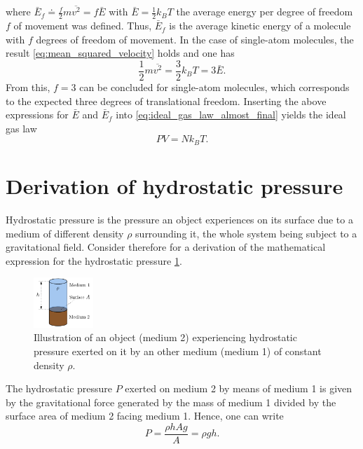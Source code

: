 \documentclass[a4paper,10pt, twocolumn]{article}
\begin{document}
\begin{equation}
\end{equation} where $\bar{E}_f \doteq \frac{f}{2}m\overline{{v^2}} = f\bar{E}$ with $\bar{E} = \frac{1}{2}k_B T$ the average energy per degree of freedom $f$ of movement was defined. Thus, $\bar{E}_f$ is the average kinetic energy of a molecule with $f$ degrees of freedom of movement. In the case of single-atom molecules, the result \cref{eq:mean_squared_velocity} holds and one has \begin{equation}
\frac{1}{2}m\overline{{v^2}} = \frac{3}{2}k_B T = 3\bar{E}.
\end{equation} From this, $f=3$ can be concluded for single-atom molecules, which corresponds to the expected three degrees of translational freedom. Inserting the above expressions for $\bar{E}$ and $\bar{E}_f$ into \cref{eq:ideal_gas_law_almost_final} yields the ideal gas law \begin{equation}
PV = Nk_B T.
\end{equation}


\section{Derivation of hydrostatic pressure}
Hydrostatic pressure is the pressure an object experiences on its surface due to a medium of different density $\rho$ surrounding it, the whole system being subject to a gravitational field. Consider therefore for a derivation of the mathematical expression for the hydrostatic pressure \cref{fig:hydrostatic-pressure-derivation}.
\begin{figure}[h]
	\centering
	\includegraphics[width=0.20\textwidth]{figures/hydrostatic-pressure-derivation.pdf}
	\caption{Illustration of an object (medium 2) experiencing hydrostatic pressure exerted on it by an other medium (medium 1) of constant density $\rho$.}
	\label{fig:hydrostatic-pressure-derivation}
\end{figure}

The hydrostatic pressure $P$ exerted on medium 2 by means of medium 1 is given by the gravitational force generated by the mass of medium 1 divided by the surface area of medium 2 facing medium 1. Hence, one can write \begin{equation}
	P = \frac{\rho h A g}{A}  = \rho g h.
\end{equation}  %
\end{document}
